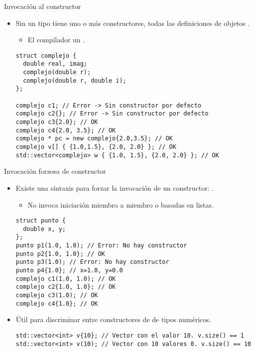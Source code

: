 \begin{frame}[fragile]{Invocación al constructor}
\begin{itemize}
  \item Sin un tipo tiene uno o más constructores, 
        todas las definiciones de objetos  
        .
    \begin{itemize}
      \item El compilador  un 
            .
    \end{itemize}
\begin{lstlisting}
struct complejo {
  double real, imag;
  complejo(double r);
  complejo(double r, double i);
};

complejo c1; // Error -> Sin constructor por defecto
complejo c2{}; // Error -> Sin constructor por defecto
complejo c3{2.0}; // OK
complejo c4{2.0, 3.5}; // OK
complejo * pc = new complejo{2.0,3.5}; // OK
complejo v[] { {1.0,1.5}, {2.0, 2.0} }; // OK
std::vector<complejo> w { {1.0, 1.5}, {2.0, 2.0} }; // OK
\end{lstlisting}
\end{itemize}
\end{frame}

\begin{frame}[fragile]{Invocación forzosa de constructor}
\begin{itemize}
  \item Existe una sintaxis para forzar la invocación de un constructor:
        .
    \begin{itemize}
      \item No invoca iniciación miembro a miembro o basadas en listas.
    \end{itemize}

\begin{lstlisting}
struct punto {
  double x, y;
};
punto p1(1.0, 1.0); // Error: No hay constructor
punto p2{1.0, 1.0}; // OK
punto p3(1.0); // Error: No hay constructor
punto p4{1.0}; // x=1.0, y=0.0
complejo c1(1.0, 1.0); // OK
complejo c2{1.0, 1.0}; // OK
complejo c3(1.0); // OK
complejo c4{1.0}; // OK
\end{lstlisting}

  \item Útil para discriminar entre constructores de  de tipos numéricos.
\begin{lstlisting}
std::vector<int> v{10}; // Vector con el valor 10. v.size() == 1
std::vector<int> v(10); // Vector con 10 valores 0. v.size() == 10
\end{lstlisting}
\end{itemize}
\end{frame}

